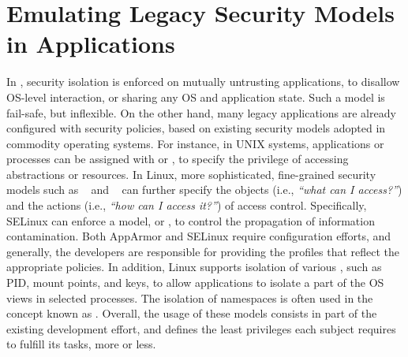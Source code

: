 

\section{Emulating Legacy Security Models in Applications}
\label{sec:future:security}


In \liboses{}, security isolation is enforced on mutually untrusting applications,
to disallow OS-level interaction,
or sharing any OS and application state.
Such a model is fail-safe, but inflexible.
On the other hand, many legacy applications are already
configured with security policies,
based on existing security models adopted in commodity operating systems.
For instance, in UNIX systems, applications or processes
can be assigned with  or ,
to specify the privilege of accessing abstractions or resources.
In Linux, more sophisticated, fine-grained security models
such as ~\citep{apparmor} and ~\citep{selinux}
can further specify the objects (i.e., \emph{``what can I access?''})
and the actions (i.e., \emph{``how can I access it?''}) of access control.
Specifically, SELinux can enforce a  model, or ,
to control the propagation of information contamination.
Both AppArmor and SELinux require configuration efforts,
and generally, the developers are responsible for
providing the profiles
that reflect the appropriate policies.
In addition,
Linux supports isolation of various ,
such as PID, mount points, and \sysvipc{} keys, 
to allow applications to isolate a part of the OS views in selected processes.
The isolation of namespaces is often used in the concept known as .
Overall, the usage of these models consists in
part of the existing development effort,
and defines the least privileges each subject requires
to fulfill its tasks, more or less.


